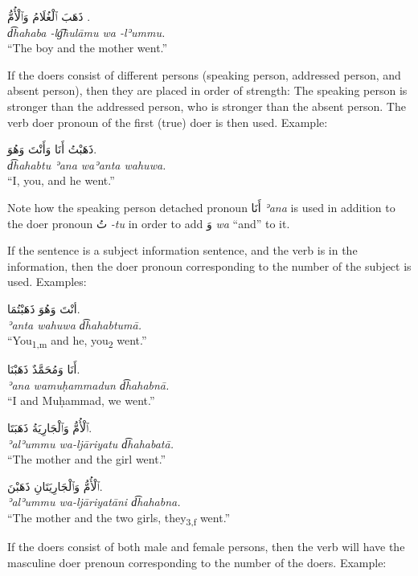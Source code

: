 \documentclass[
  10pt,
]{book}
\begin{document}
\foreignlanguage{arabic}{ذَهَبَ ٱلْغُلَامُ وَٱلْأُمُّ .}\\
\emph{d͡hahaba -lg͡hulāmu wa -lʾummu.}\\
\enquote{The boy and the mother went.}

If the doers consist of different persons (speaking person, addressed person, and absent person), then they are placed in order of strength: The speaking person is stronger than the addressed person, who is stronger than the absent person. The verb doer pronoun of the first (true) doer is then used. Example:

\foreignlanguage{arabic}{ذَهَبْتُ أَنَا وَأَنْتَ وَهُوَ.}\\
\emph{d͡hahabtu ʾana waʾanta wahuwa.}\\
\enquote{I, you, and he went.}

Note how the speaking person detached pronoun \foreignlanguage{arabic}{أَنَا} \emph{ʾana} is used in addition to the doer pronoun \foreignlanguage{arabic}{تُ} \emph{-tu} in order to add \foreignlanguage{arabic}{وَ} \emph{wa} \enquote{and} to it.

If the sentence is a subject information sentence, and the verb is in the information, then the doer pronoun corresponding to the number of the subject is used. Examples:

\foreignlanguage{arabic}{أنْتَ وَهُوَ ذَهَبْتُمَا.}\\
\emph{ʾanta wahuwa d͡hahabtumā.}\\
\enquote{You\textsubscript{1,m} and he, you\textsubscript{2} went.}

\foreignlanguage{arabic}{أَنَا وَمُحَمَّدٌ ذَهَبْنَا.}\\
\emph{ʾana wamuḥammadun d͡hahabnā.}\\
\enquote{I and Muḥammad, we went.}

\foreignlanguage{arabic}{ٱلْأُمُّ وَٱلْجَارِيَةُ ذَهَبَتَا.}\\
\emph{ʾalʾummu wa-ljāriyatu d͡hahabatā.}\\
\enquote{The mother and the girl went.}

\foreignlanguage{arabic}{ٱلْأُمُّ وَٱلْجَارِيَتَانِ ذَهَبْنَ.}\\
\emph{ʾalʾummu wa-ljāriyatāni d͡hahabna.}\\
\enquote{The mother and the two girls, they\textsubscript{3,f} went.}

If the doers consist of both male and female persons, then the verb will have the masculine doer prenoun corresponding to the number of the doers. Example:
\end{document}

